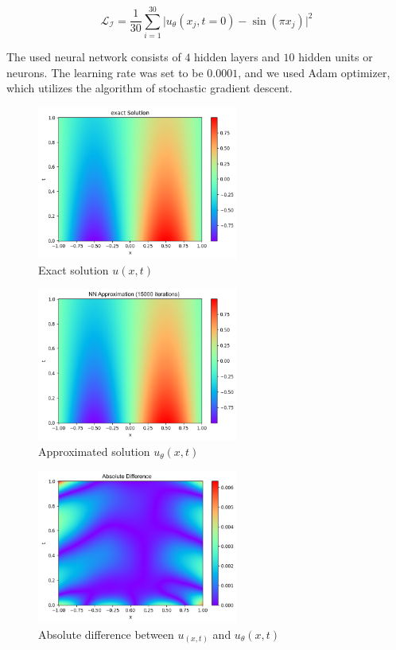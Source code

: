 \documentclass[a4paper, onecolumn, 12pt]{article}
\begin{document}
$$
\mathcal{L}_{\mathcal{I}} = \frac{1}{30} \sum_{i=1}^{30}
\Bigg| u_\theta(x_j, t=0) - \sin(\pi x_j) \Bigg|^2
$$

The used neural network consists of $4$ hidden layers and $10$ hidden units or neurons.
The learning rate was set to be $0.0001$, and we used Adam optimizer, which utilizes the 
algorithm of stochastic gradient descent. 

\begin{figure}[H]
    \centering
    \includegraphics[width=250px]{images/exact_solution_diff.png}
    \vspace{-1em}
    \caption{Exact solution $u(x,t)$}
    \label{exact diff}
\end{figure}

\begin{figure}[H]
    \centering
    \includegraphics[width=250px]{images/approx_solution_diff.png}
    \vspace{-1em}
    \caption{Approximated solution $u_\theta(x,t)$}
    \label{approximation diff}
\end{figure}

\begin{figure}[H]
    \centering
    \includegraphics[width=250px]{images/difference_diff.png}
    \vspace{-1em}
    \caption{Absolute difference between $u_(x,t)$ and $u_\theta(x,t)$}
    \label{absolute diff}
\end{figure}
\end{document}
